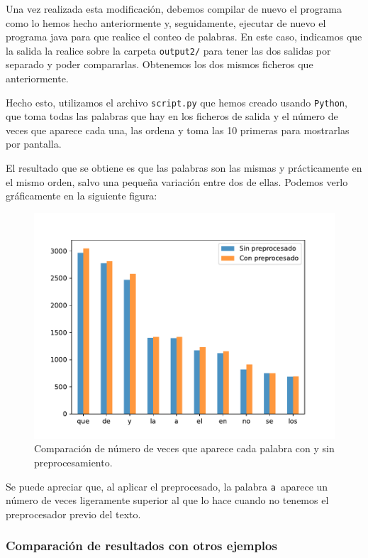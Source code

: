 \documentclass[11pt]{article}
\def\inline{\lstinline[basicstyle=\ttfamily,keywordstyle={}]}
\begin{document}
Una vez realizada esta modificación, debemos compilar de nuevo el programa como lo hemos hecho anteriormente y, seguidamente, ejecutar de nuevo el programa java para que realice el conteo de palabras. En este caso, indicamos que la salida la realice sobre la carpeta  \inline{output2/} para tener las dos salidas por separado y poder compararlas. Obtenemos los dos mismos ficheros que anteriormente.

Hecho esto, utilizamos el archivo  \inline{script.py} que hemos creado usando  \inline{Python}, que toma todas las palabras que hay en los ficheros de salida y el número de veces que aparece cada una, las ordena y toma las 10 primeras para mostrarlas por pantalla. 

El resultado que se obtiene es que las palabras son las mismas y prácticamente en el mismo orden, salvo una pequeña variación entre dos de ellas. Podemos verlo gráficamente en la siguiente figura:

\begin{figure}[H]
\centering
\includegraphics[scale=0.8]{barplot.pdf}
\caption{Comparación de número de veces que aparece cada palabra con y sin preprocesamiento.}
\end{figure}

Se puede apreciar que, al aplicar el preprocesado, la palabra \inline{a }aparece un número de veces ligeramente superior al que lo hace cuando no tenemos el preprocesador previo del texto.


\subsubsection*{ Comparación de resultados con otros ejemplos}
\end{document}
